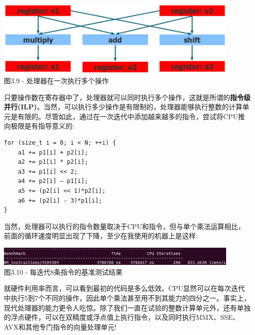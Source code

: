 \hspace*{\fill} \\ %
\begin{center}
\includegraphics[width=0.9\textwidth]{content/1/chapter3/images/9.jpg}\\
图3.9 - 处理器在一次执行多个操作
\end{center}

只要操作数在寄存器中了，处理器就可以同时执行多个操作，这就是所谓的\textbf{指令级并行(ILP)}。当然，可以执行多少操作是有限制的，处理器能够执行整数的计算单元是有限的。尽管如此，通过在一次迭代中添加越来越多的指令，尝试将CPU推向极限是有指导意义的:

\begin{lstlisting}[style=styleCXX]
for (size_t i = 0; i < N; ++i) {
	a1 += p1[i] + p2[i];
	a2 += p1[i] * p2[i];
	a3 += p1[i] << 2;
	a4 += p2[i] – p1[i];
	a5 += (p2[i] << 1)*p2[i];
	a6 += (p2[i] - 3)*p1[i];
}
\end{lstlisting}

当然，处理器可以执行的指令数量取决于CPU和指令，但与单个乘法运算相比，前面的循环速度明显出现了下降，至少在我使用的机器上是这样:

\begin{center}
\includegraphics[width=0.9\textwidth]{content/1/chapter3/images/10.jpg}\\
图3.10 - 每迭代8条指令的基准测试结果
\end{center}

就硬件利用率而言，可以看到最初的代码是多么低效。CPU显然可以在每次迭代中执行5到7个不同的操作，因此单个乘法甚至用不到其能力的四分之一。事实上，现代处理器的能力更令人吃惊。除了我们一直在试验的整数计算单元外，还有单独的浮点硬件，可以在双精度或浮点值上执行指令，以及同时执行MMX、SSE、AVX和其他专门指令的向量处理单元!


